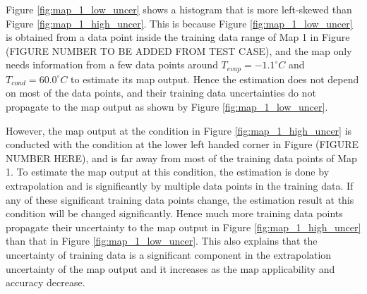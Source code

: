 Figure \ref{fig:map_1_low_uncer} shows a histogram that is more left-skewed than Figure \ref{fig:map_1_high_uncer}. This is because Figure \ref{fig:map_1_low_uncer} is obtained from a data point inside the training data range of Map 1 in Figure (FIGURE NUMBER TO BE ADDED FROM TEST CASE), and the map only needs information from a few data points around $T_{evap} = -1.1^\circ C$ and $T_{cond} = 60.0^\circ C$ to estimate its map output. Hence the estimation does not depend on most of the data points, and their training data uncertainties do not propagate to the map output as shown by Figure \ref{fig:map_1_low_uncer}. 

However, the map output at the condition in Figure \ref{fig:map_1_high_uncer} is conducted with the condition at the lower left handed corner in Figure (FIGURE NUMBER HERE), and is far away from most of the training data points of Map 1. To estimate the map output at this condition, the estimation is done by extrapolation and is significantly by multiple data points in the training data. If any of these significant training data points change, the estimation result at this condition will be changed significantly. Hence much more training data points propagate their uncertainty to the map output in Figure \ref{fig:map_1_high_uncer} than that in Figure \ref{fig:map_1_low_uncer}. This also explains that the uncertainty of training data is a significant component in the extrapolation uncertainty of the map output and it increases as the map applicability and accuracy decrease.
